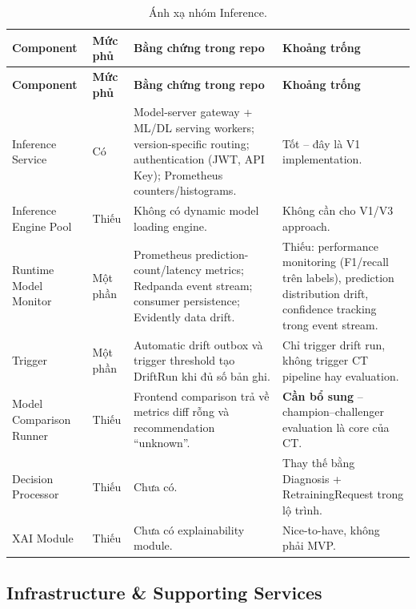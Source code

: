 \documentclass[11pt,a4paper]{article}
\newcommand{\statusyes}{\textcolor{green!45!black}{Có}}
\newcommand{\statuspartial}{\textcolor{orange!75!black}{Một phần}}
\newcommand{\statusno}{\textcolor{red!60!black}{Thiếu}}
\begin{document}
\begin{longtable}{@{}P{2.6cm}P{1.6cm}P{4.7cm}P{4.5cm}@{}}
\caption{Ánh xạ nhóm Inference.}\\
\toprule
\textbf{Component} & \textbf{Mức phủ} & \textbf{Bằng chứng trong repo} & \textbf{Khoảng trống} \\
\midrule
\endfirsthead
\toprule
\textbf{Component} & \textbf{Mức phủ} & \textbf{Bằng chứng trong repo} & \textbf{Khoảng trống} \\
\midrule
\endhead
Inference Service & \statusyes & Model-server gateway + ML/DL serving workers; version-specific routing; authentication (JWT, API Key); Prometheus counters/histograms. & Tốt -- đây là V1 implementation. \\
\addlinespace
Inference Engine Pool & \statusno & Không có dynamic model loading engine. & Không cần cho V1/V3 approach. \\
\addlinespace
Runtime Model Monitor & \statuspartial & Prometheus prediction-count/latency metrics; Redpanda event stream; consumer persistence; Evidently data drift. & Thiếu: performance monitoring (F1/recall trên labels), prediction distribution drift, confidence tracking trong event stream. \\
\addlinespace
Trigger & \statuspartial & Automatic drift outbox và trigger threshold tạo DriftRun khi đủ số bản ghi. & Chỉ trigger drift run, không trigger CT pipeline hay evaluation. \\
\addlinespace
Model Comparison Runner & \statusno & Frontend comparison trả về metrics diff rỗng và recommendation ``unknown''. & \textbf{Cần bổ sung} -- champion--challenger evaluation là core của CT. \\
\addlinespace
Decision Processor & \statusno & Chưa có. & Thay thế bằng Diagnosis + RetrainingRequest trong lộ trình. \\
\addlinespace
XAI Module & \statusno & Chưa có explainability module. & Nice-to-have, không phải MVP. \\
\bottomrule
\end{longtable}

\subsection{Infrastructure \& Supporting Services}
\end{document}
